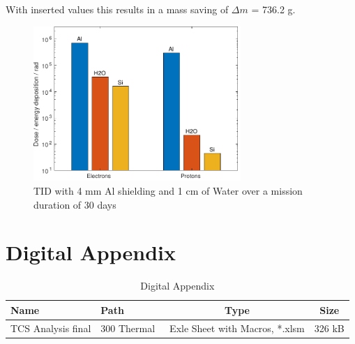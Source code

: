 With inserted values this results in a mass saving of \(\Delta m\) = 736.2 g.

\begin{figure}[htp]
	\centering
	\includegraphics[width=0.7\textwidth]{Media/J_Improvements_Ice}
	\caption{TID with 4 mm Al shielding and 1 cm of Water over a mission duration of 30 days}
	\label{fig:Radiation_Improvements_Ice}
\end{figure}

\clearpage

\setcounter{figure}{0}
\setcounter{table}{0}

\section{Digital Appendix}		\label{app:DigitalAppendix}

\begin{table}[htb]
	\centering
	\begin{tabular}{llcc}
		\hline
		Name  & Path & Type & Size  \\ \hline
		TCS Analysis final & 300 Thermal\ & Exle Sheet with Macros, *.xlsm & 326 kB  \\   \hline
	\end{tabular}
	\caption{Digital Appendix}
	\label{app:DigitalAppendix}
\end{table}

\cleardoublepage